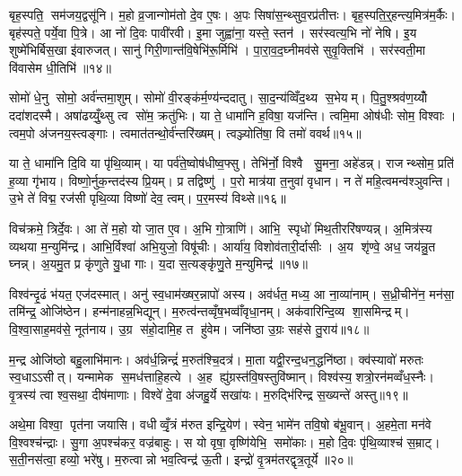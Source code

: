 बृह॒स्पति॒ सम॑जय॒द्वसू॑नि। म॒हो व्र॒जान्गोम॑तो दे॒व ए॒षः। अ॒पः सिषा॑स॒न्थ्सुव॒रप्र॑तीत्तः। बृह॒स्पति॒र्॒हन्त्य॒मित्र॑म॒र्कैः। बृह॑स्पते॒ पर्ये॒वा पि॒त्रे। आ नो॑ दि॒वः पावी॑रवी। इ॒मा जुह्वा॑ना॒ यस्ते॒ स्तन॑। सर॑स्वत्य॒भि नो॑ नेषि। इ॒य शुष्मे॑भिर्बिस॒खा इ॑वारुजत्। सानु॑ गिरी॒णान्त॑वि॒षेभि॑रू॒र्मिभि॑। पा॒रा॒व॒द॒घ्नीमव॑से सुवृ॒क्तिभि॑। सर॑स्वती॒मा वि॑वासेम धी॒तिभि॑॥१४॥\anuvakamend[दे॒व॒यानैर्दे॒वाः सुपू॑तय्यँजत्र॒ हस्त॒मस्ति॒ तमास्यू॒र्मिभि॒र्द्वे च॑]

सोमो॑ धे॒नु सोमो॒ अर्व॑न्तमा॒शुम्। सोमो॑ वी॒रङ्क॑र्म॒ण्य॑न्ददातु। सा॒द॒न्य॑व्विँद॒थ्य स॒भेयम्। पि॒तु॒श्श्रव॑ण॒य्योँ ददा॑शदस्मै। अषा॑ढय्युँ॒थ्सु त्व सो॑म॒ क्रतु॑भिः। या ते॒ धामा॑नि ह॒विषा॒ यज॑न्ति। त्वमि॒मा ओष॑धीः सोम॒ विश्वाः। त्वम॒पो अ॑जनय॒स्त्वङ्गाः। त्वमात॑तन्थो॒र्व॑न्तरि॑ख्षम्। त्वञ्ज्योति॑षा॒ वि तमो॑ ववर्थ॥१५॥

या ते॒ धामा॑नि दि॒वि या पृ॑थि॒व्याम्। या पर्व॑ते॒ष्वोष॑धीष्व॒फ्सु। तेभि॑र्नो॒ विश्वै सु॒मना॒ अहे॑डन्न्। राजन्थ्सोम॒ प्रति॑ ह॒व्या गृ॑भाय। विष्णो॒र्नुक॒न्तद॑स्य प्रि॒यम्। प्र तद्विष्णु॑। प॒रो मात्र॑या त॒नुवा॑ वृधान। न ते॑ महि॒त्वमन्व॑श्ञुवन्ति। उ॒भे ते॑ विद्म॒ रज॑सी पृथि॒व्या विष्णो॑ देव॒ त्वम्। प॒र॒मस्य॑ विथ्से॥१६॥

विच॑क्रमे॒ त्रिर्दे॒वः। आ ते॑ म॒हो यो जा॒त ए॒व। अ॒भि गो॒त्राणि॑। आभि॒ स्पृधो॑ मिथ॒तीररि॑षण्यन्न्। अ॒मित्र॑स्य व्यथया म॒न्युमि॑न्द्र। आभि॒र्विश्वा॑ अभि॒युजो॒ विषू॑चीः। आर्या॑य॒ विशोव॑तारी॒र्दासीः। अ॒य शृ॑ण्वे॒ अध॒ जय॑न्नु॒त घ्नन्न्। अ॒यमु॒त प्र कृ॑णुते यु॒धा गाः। य॒दा स॒त्यङ्कृ॑णु॒ते म॒न्युमिन्द्र॑॥१७॥

विश्व॑न्दृ॒ढं भ॑यत॒ एज॑दस्मात्। अनु॑ स्व॒धाम॑ख्षर॒न्नापो॑ अस्य। अव॑र्धत॒ मध्य॒ आ ना॒व्या॑नाम्। स॒ध्री॒चीने॑न॒ मन॑सा॒ तमि॑न्द्र॒ ओजि॑ष्ठेन। हन्म॑नाहन्न॒भिद्यून्। म॒रुत्व॑न्तव्वृँष॒भव्वाँ॑वृधा॒नम्। अक॑वारिन्दि॒व्य शा॒समिन्द्रम्। वि॒श्वा॒साह॒मव॑से॒ नूत॑नाय। उ॒ग्र स॑हो॒दामि॒ह त हु॑वेम। जनि॑ष्ठा उ॒ग्रः सह॑से तु॒राय॑॥१८॥

म॒न्द्र ओजि॑ष्ठो बहु॒लाभि॑मानः। अव॑र्ध॒न्निन्द्रं॑ म॒रुत॑श्चि॒दत्र॑। मा॒ता यद्वी॒रन्द॒धन॒द्धनि॑ष्ठा। क्व॑स्यावो॑ मरुतः स्व॒धाऽऽसीत्। यन्मामेक स॒मध॑त्ताहि॒हत्ये। अ॒ह ह्यु॑ग्रस्त॑वि॒षस्तुवि॑ष्मान्। विश्व॑स्य॒ शत्रो॒रन॑मव्वँध॒स्नैः। वृ॒त्रस्य॑ त्वा श्व॒सथा॒ दीष॑माणाः। विश्वे॑ दे॒वा अ॑जहु॒र्ये सखा॑यः। म॒रुद्भि॑रिन्द्र स॒ख्यन्ते॑ अस्तु॥१९॥

अथे॒मा विश्वा॒ पृत॑ना जयासि। वधीव्वृँ॒त्रं म॑रुत इन्द्रि॒येण॑। स्वेन॒ भामे॑न तवि॒षो ब॑भू॒वान्। अ॒हमे॒ता मन॑वे वि॒श्वश्च॑न्द्राः। सु॒गा अ॒पश्च॑कर॒ वज्र॑बाहुः। स यो वृषा॒ वृष्णि॑येभि॒ समो॑काः। म॒हो दि॒वः पृ॑थि॒व्याश्च॑ स॒म्राट्। स॒ती॒नस॑त्वा॒ हव्यो॒ भरे॑षु। म॒रुत्वान्नो भव॒त्विन्द्र॑ ऊ॒ती। इन्द्रो॑ वृ॒त्रम॑तरद्वृत्र॒तूर्ये॥२०॥

